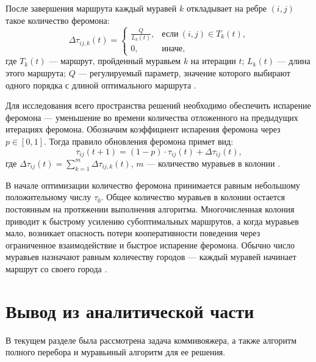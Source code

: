 После завершения маршрута каждый муравей $k$ откладывает на ребре $(i, j)$ такое количество феромона:
\begin{equation}
\Delta \tau_{ij,k}(t) = 
\begin{cases}
\frac{Q}{L_{k}(t)}, & \text{если}~(i, j) \in T_{k}(t), \\
0, & \text{иначе},
\end{cases}
\end{equation}
где $T_{k}(t)$ --- маршрут, пройденный муравьем $k$ на итерации $t$; $L_{k}(t)$ --- длина этого маршрута; $Q$ --- регулируемый параметр, значение которого выбирают одного порядка с длиной оптимального маршрута \cite{Shtovba2003}.

Для исследования всего пространства решений необходимо обеспечить испарение феромона --- уменьшение во времени количества отложенного на предыдущих итерациях феромона. 
Обозначим коэффициент испарения феромона через $p \in [0, 1]$. Тогда правило обновления феромона примет вид:
\begin{equation}
\tau_{ij}(t + 1) = (1 - p) \cdot \tau_{ij}(t) + \Delta \tau_{ij}(t),
\end{equation}
где $\Delta \tau_{ij}(t) = \displaystyle\sum_{k = 1}^{m} \Delta \tau_{ij,k}(t)$, $m$ --- количество муравьев в колонии \cite{Shtovba2003}.

В начале оптимизации количество феромона принимается равным небольшому положительному числу $\tau_0$. 
Общее количество муравьев в колонии остается постоянным на протяжении выполнения алгоритма. 
Многочисленная колония приводит к быстрому усилению субоптимальных маршрутов, а когда муравьев мало, возникает опасность потери кооперативности поведения через ограниченное взаимодействие и быстрое испарение феромона. 
Обычно число муравьев назначают равным количеству городов --- каждый муравей начинает маршрут со своего города \cite{Shtovba2003}.

\section*{Вывод из аналитической части}

В текущем разделе была рассмотрена задача коммивояжера, а также алгоритм полного перебора и муравьиный алгоритм для ее решения. 
